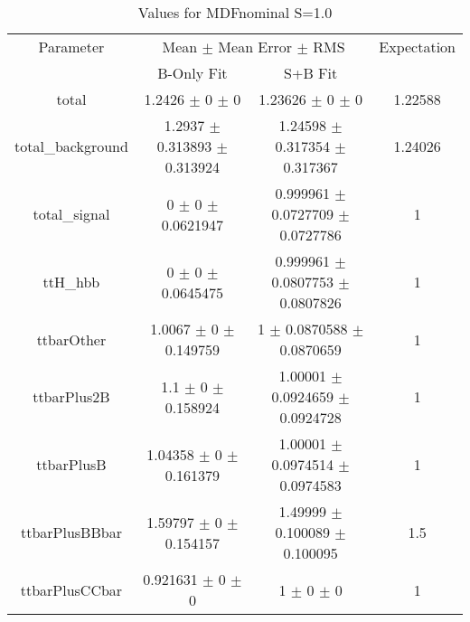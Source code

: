 \begin{table}
\centering
\caption{Values for MDFnominal S=1.0}
\begin{tabular}{cccc}
\toprule
Parameter & \multicolumn{2}{c}{Mean $\pm$ Mean Error $\pm$ RMS} & Expectation\\
 & B-Only Fit & S+B Fit & \\
\midrule
total & \num{1.2426} $\pm$ \num{0} $\pm$ \num{0} & \num{1.23626} $\pm$ \num{0} $\pm$ \num{0} & \num{1.22588}\\
total\_background & \num{1.2937} $\pm$ \num{0.313893} $\pm$ \num{0.313924} & \num{1.24598} $\pm$ \num{0.317354} $\pm$ \num{0.317367} & \num{1.24026}\\
total\_signal & \num{0} $\pm$ \num{0} $\pm$ \num{0.0621947} & \num{0.999961} $\pm$ \num{0.0727709} $\pm$ \num{0.0727786} & \num{1}\\
ttH\_hbb & \num{0} $\pm$ \num{0} $\pm$ \num{0.0645475} & \num{0.999961} $\pm$ \num{0.0807753} $\pm$ \num{0.0807826} & \num{1}\\
ttbarOther & \num{1.0067} $\pm$ \num{0} $\pm$ \num{0.149759} & \num{1} $\pm$ \num{0.0870588} $\pm$ \num{0.0870659} & \num{1}\\
ttbarPlus2B & \num{1.1} $\pm$ \num{0} $\pm$ \num{0.158924} & \num{1.00001} $\pm$ \num{0.0924659} $\pm$ \num{0.0924728} & \num{1}\\
ttbarPlusB & \num{1.04358} $\pm$ \num{0} $\pm$ \num{0.161379} & \num{1.00001} $\pm$ \num{0.0974514} $\pm$ \num{0.0974583} & \num{1}\\
ttbarPlusBBbar & \num{1.59797} $\pm$ \num{0} $\pm$ \num{0.154157} & \num{1.49999} $\pm$ \num{0.100089} $\pm$ \num{0.100095} & \num{1.5}\\
ttbarPlusCCbar & \num{0.921631} $\pm$ \num{0} $\pm$ \num{0} & \num{1} $\pm$ \num{0} $\pm$ \num{0} & \num{1}\\
\bottomrule
\end{tabular}
\end{table}
